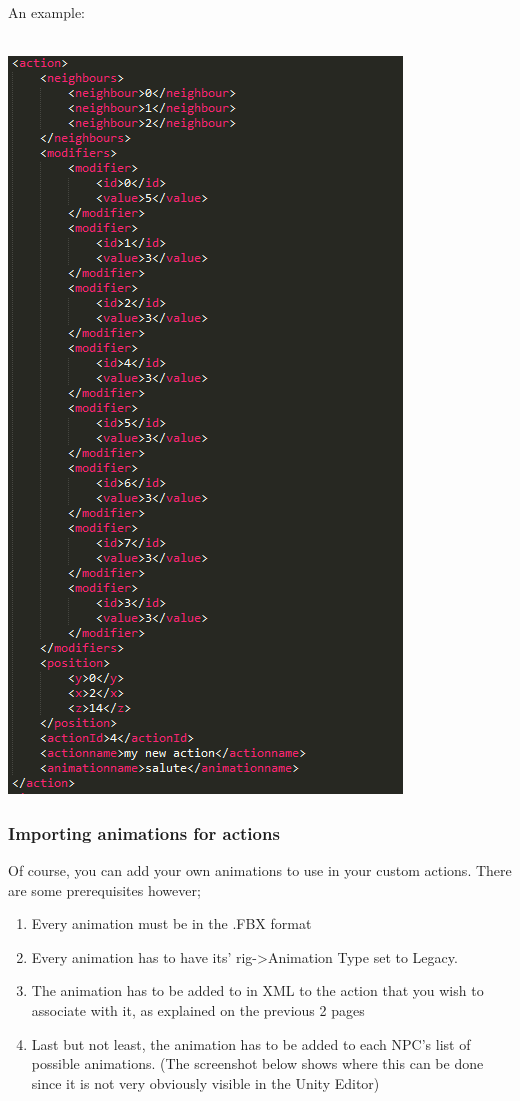 \documentclass[11pt]{article} %
\begin{document}
\newpage
An example: 

~\\
\includegraphics{13}

\newpage
\subsubsection{Importing animations for actions}
Of course, you can add your own animations to use in your custom actions. There are some prerequisites however;

\begin{enumerate}
\item Every animation must be in the .FBX format
\item Every animation has to have its' rig->Animation Type set to Legacy. 
\item The animation has to be added to in XML to the action that you wish to associate with it, as explained on the previous 2 pages
\item Last but not least, the animation has to be added to each NPC's list of possible animations. (The screenshot below shows where this can be done since it is not very obviously visible in the Unity Editor)
\end{enumerate}
\end{document}
